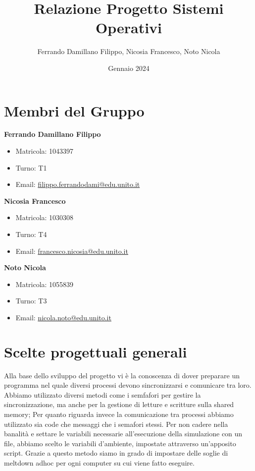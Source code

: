 \documentclass{article}
\title{Relazione Progetto Sistemi Operativi}
\author{Ferrando Damillano Filippo, Nicosia Francesco, Noto Nicola}
\date{Gennaio 2024}
\begin{document}
\maketitle

\tableofcontents

\section{Membri del Gruppo}

\textbf{Ferrando Damillano Filippo}
\begin{itemize}
    \item Matricola: 1043397
    \item Turno: T1    
    \item Email: \href{mailto:filippo.ferrandodami@edu.unito.it}{filippo.ferrandodami@edu.unito.it}
\end{itemize}
\textbf{Nicosia Francesco}
\begin{itemize}
    \item Matricola: 1030308
    \item Turno: T4
    \item Email: \href{mailto:francesco.nicosia@edu.unito.it}{francesco.nicosia@edu.unito.it}
\end{itemize}
\textbf{Noto Nicola}
\begin{itemize}
    \item Matricola: 1055839
    \item Turno: T3
    \item Email: \href{mailto:nicola.noto@edu.unito.it}{nicola.noto@edu.unito.it}
\end{itemize}


\section{Scelte progettuali generali}

Alla base dello sviluppo del progetto vi è la conoscenza di dover preparare un programma nel quale diversi processi devono sincronizzarsi e comunicare tra loro.
Abbiamo utilizzato diversi metodi come i semfafori per gestire la sincronizzazione, ma anche per la gestione di letture e scritture sulla shared memory; Per quanto riguarda invece la comunicazione tra processi abbiamo utilizzato sia code che messaggi che i semafori stessi.
Per non cadere nella banalità e settare le variabili necessarie all'esecuzione della simulazione con un file, abbiamo scelto le variabili d'ambiente, impostate attraverso un'apposito script.
Grazie a questo metodo siamo in grado di impostare delle soglie di meltdown adhoc per ogni computer su cui viene fatto eseguire.
\end{document}

